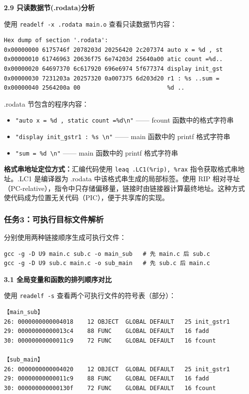 \documentclass[12pt,a4paper]{ctexart}
\begin{document}
\textbf{2.9 只读数据节(.rodata)分析}

使用 \texttt{readelf -x .rodata main.o} 查看只读数据节内容：

\begin{lstlisting}
Hex dump of section '.rodata':
0x00000000 6175746f 2078203d 20256420 2c207374 auto x = %d , st
0x00000010 61746963 20636f75 6e74203d 25640a00 atic count =%d..
0x00000020 64697370 6c617920 696e6974 5f677374 display init_gst
0x00000030 7231203a 20257320 0a007375 6d203d20 r1 : %s ..sum =
0x00000040 2564200a 00                         %d ..
\end{lstlisting}

.rodata 节包含的程序内容：
\begin{itemize}[nosep]
    \item \texttt{"auto x = \%d , static count =\%d\textbackslash n"} —— fcount 函数中的格式字符串
    \item \texttt{"display init\_gstr1 : \%s \textbackslash n"} —— main 函数中的 printf 格式字符串
    \item \texttt{"sum = \%d \textbackslash n"} —— main 函数中的 printf 格式字符串
\end{itemize}

\textbf{格式串地址定位方式：}汇编代码使用 \texttt{leaq .LC1(\%rip), \%rax} 指令获取格式串地址。.LC1 是编译器为 .rodata 中该格式串生成的局部标签。使用 RIP 相对寻址（PC-relative），指令中只存储偏移量，链接时由链接器计算最终地址。这种方式使代码成为位置无关代码（PIC），便于共享库的实现。

\subsubsection*{任务3：可执行目标文件解析}

分别使用两种链接顺序生成可执行文件：

\begin{lstlisting}
gcc -g -D U9 main.c sub.c -o main_sub   # 先 main.c 后 sub.c
gcc -g -D U9 sub.c main.c -o sub_main   # 先 sub.c 后 main.c
\end{lstlisting}

\textbf{3.1 全局变量和函数的排列顺序对比}

使用 \texttt{readelf -s} 查看两个可执行文件的符号表（部分）：

\begin{lstlisting}
【main_sub】
26: 0000000000004018    12 OBJECT  GLOBAL DEFAULT   25 init_gstr1
29: 00000000000013c4    88 FUNC    GLOBAL DEFAULT   16 fadd
30: 00000000000011c9    72 FUNC    GLOBAL DEFAULT   16 fcount

【sub_main】
26: 0000000000004020    12 OBJECT  GLOBAL DEFAULT   25 init_gstr1
29: 00000000000011c9    88 FUNC    GLOBAL DEFAULT   16 fadd
30: 000000000000130f    72 FUNC    GLOBAL DEFAULT   16 fcount
\end{lstlisting}
\end{document}
